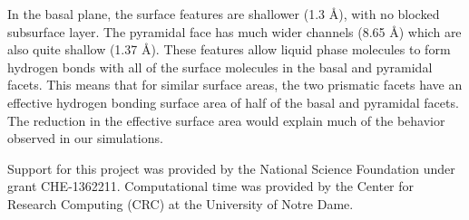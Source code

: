 \documentclass{pnastwo}
\begin{document}
\begin{article}
In the basal plane, the surface features are shallower (1.3 \AA), with
no blocked subsurface layer.  The pyramidal face has much wider
channels (8.65 \AA) which are also quite shallow (1.37 \AA).  These
features allow liquid phase molecules to form hydrogen bonds with all
of the surface molecules in the basal and pyramidal facets.  This
means that for similar surface areas, the two prismatic facets have an
effective hydrogen bonding surface area of half of the basal and
pyramidal facets.  The reduction in the effective surface area would
explain much of the behavior observed in our simulations.

\begin{acknowledgments}
  Support for this project was provided by the National
  Science Foundation under grant CHE-1362211. Computational time was
  provided by the Center for Research Computing (CRC) at the
  University of Notre Dame.
\end{acknowledgments}





\end{article}
\end{document}
